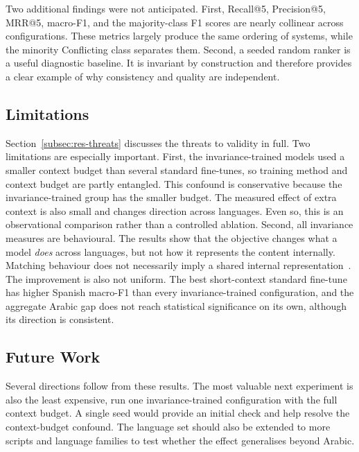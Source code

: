 Two additional findings were not anticipated. First, Recall@5, Precision@5, MRR@5, macro-F1, and the
majority-class F1 scores are nearly collinear across configurations. These metrics largely produce the
same ordering of systems, while the minority \textsf{Conflicting} class separates them. Second, a
seeded random ranker is a useful diagnostic baseline. It is invariant by construction and therefore
provides a clear example of why consistency and quality are independent.

\subsection{Limitations}
\label{subsec:concl-limits}

Section~\ref{subsec:res-threats} discusses the threats to validity in full. Two limitations are
especially important. First, the invariance-trained models used a smaller context budget than several
standard fine-tunes, so training method and context budget are partly entangled. This confound is
conservative because the invariance-trained group has the smaller budget. The measured effect of
extra context is also small and changes direction across languages. Even so, this is an observational
comparison rather than a controlled ablation. Second, all invariance measures are behavioural. The
results show that the objective changes what a model \emph{does} across languages, but not how it
represents the content internally. Matching behaviour does not necessarily imply a shared internal
representation~\cite{ifergan2024beneathsurfaceconsistencyexploring}. The improvement is also not
uniform. The best short-context standard fine-tune has higher Spanish macro-F1 than every
invariance-trained configuration, and the aggregate Arabic gap does not reach statistical
significance on its own, although its direction is consistent.

\subsection{Future Work}
\label{subsec:concl-future}

Several directions follow from these results. The most valuable next experiment is also the least
expensive, run one invariance-trained configuration with the full context budget. A single seed would
provide an initial check and help resolve the context-budget confound. The language set should also
be extended to more scripts and language families to test whether the effect generalises beyond
Arabic.

